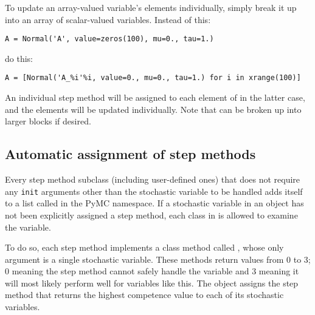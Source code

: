 To update an array-valued variable's elements individually, simply break it up into an array of scalar-valued variables. Instead of this:
\begin{verbatim}
A = Normal('A', value=zeros(100), mu=0., tau=1.)
\end{verbatim}
do this:
\begin{verbatim}
A = [Normal('A_%i'%i, value=0., mu=0., tau=1.) for i in xrange(100)]
\end{verbatim}
An individual step method will be assigned to each element of  in the latter case, and the elements will be updated individually. Note that  can be broken up into larger blocks if desired.

\subsection{Automatic assignment of step methods}
Every step method subclass (including user-defined ones) that does not require any \texttt{init} arguments other than the stochastic variable to be handled adds itself to a list called  in the PyMC namespace. If a stochastic variable in an  object has not been explicitly assigned a step method, each class in  is allowed to examine the variable.

To do so, each step method implements a class method called , whose only argument is a single stochastic variable. These methods return values from 0 to 3; 0 meaning the step method cannot safely handle the variable and 3 meaning it will most likely perform well for variables like this. The  object assigns the step method that returns the highest competence value to each of its stochastic variables.

